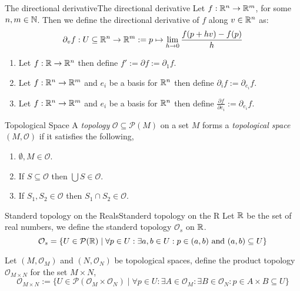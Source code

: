 \documentclass{article}
\newcommand{\tp}{\mathcal{O}}
\newcommand{\pset}[1]{\mathcal{P}(#1)}
\begin{document}
\begin{definition}{The directional derivative}{The directional derivative}
    Let $f : \mathbb{R}^n \to \mathbb{R}^m$, for some $n, m \in \mathbb{N}$.
    Then we define the directional derivative of $f$ along $v \in \mathbb{R}^n$ as:
    $$\partial_v f : U \subseteq \mathbb{R}^n \to \mathbb{R}^m := p \mapsto \lim_{h \to 0} \frac{f(p + hv) - f(p)}{h}$$
\end{definition}

\begin{notation}{}{}
    \begin{enumerate}[label=(\roman*)]
        \item Let $f: \mathbb{R} \to \mathbb{R}^n$ then define $f' := \partial f := \partial_1 f$.
        \item Let $f: \mathbb{R}^n \to \mathbb{R}^m$ and $e_i$ be a basis for $\mathbb{R}^n$ then define $\partial_i f := \partial_{e_i} f$.
        \item Let $f: \mathbb{R}^n \to \mathbb{R}^m$ and $e_i$ be a basis for $\mathbb{R}^n$ then define $\frac{\partial f}{\partial e_i} := \partial_{e_i} f$.
    \end{enumerate}
\end{notation}{}{}


\begin{definition}{Topological Space}{}
    A \emph{topology} $\tp \subseteq \pset{M}$ on a set $M$ forms a \emph{topological space} $(M, \tp)$ if it satisfies the following,

    \begin{enumerate}[label=(\roman*)]
        \item $\emptyset, M \in \tp$.
        \item If $S \subseteq \tp$ then $\bigcup S \in \tp$.
        \item If $S_1, S_2 \in \tp$ then $S_1 \cap S_2 \in \tp$.
    \end{enumerate}
\end{definition}


\begin{example}{Standerd topology on the Reals}{Standerd topology on the R}
    Let $\mathbb{R}$ be the set of real numbers, we define the standerd topology $\tp_s$ on $\mathbb{R}$.
    $$\tp_s = \{U \in \pset{\R} \mid \forall p  \in U : \exists a, b \in U : p \in (a,b) \tand (a,b) \subseteq U\}$$
\end{example}

\begin{definition}{}{}
    Let $(M, \tp_M)$ and $(N, \tp_N)$ be topological spaces, define the product topology $\tp_{M \times N}$ for the set $M \times N$,
    $$\tp_{M \times N}  := \{U \in \pset{\tp_M \times \tp_N} \mid \forall p \in U : \exists A \in \tp_M : \exists B \in \tp_N : p \in A \times B \subseteq U\}$$
\end{definition}
\end{document}
